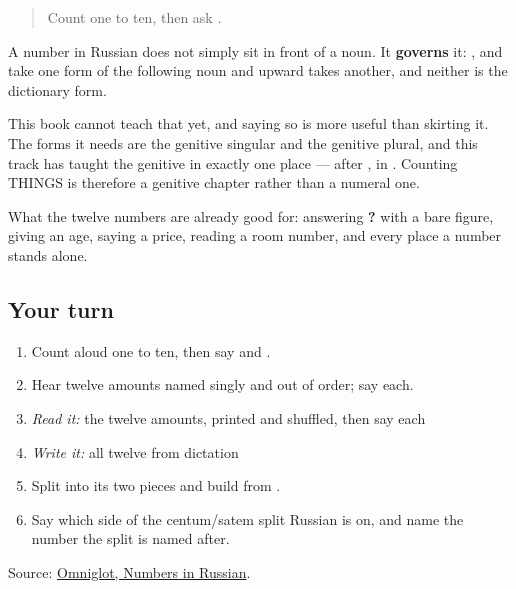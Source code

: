 \label{lesson:RU-C25-practice}



\begin{quote}
Count one to ten, then ask \textbf{}.
\end{quote}

\begin{grammarlens}[title={Grammar Lens: what a Russian number does to the noun after it}]
A number in Russian does not simply sit in front of a noun. It \textbf{governs} it: \textbf{}, \textbf{} and \textbf{} take one form of the following noun and \textbf{} upward takes another, and neither is the dictionary form.

This book cannot teach that yet, and saying so is more useful than skirting it. The forms it needs are the genitive singular and the genitive plural, and this track has taught the genitive in exactly one place — after \textbf{}, in \textbf{ }. Counting THINGS is therefore a genitive chapter rather than a numeral one.

What the twelve numbers are already good for: answering \textbf{?} with a bare figure, giving an age, saying a price, reading a room number, and every place a number stands alone.
\end{grammarlens}

\subsection*{Your turn}
\begin{enumerate}
\raggedright
  \item Count aloud one to ten, then say \textbf{} and \textbf{}.
  \item Hear twelve amounts named singly and out of order; say each.
  \item \emph{Read it:} the twelve amounts, printed and shuffled, then say each
  \item \emph{Write it:} all twelve from dictation
  \item Split \textbf{} into its two pieces and build \textbf{} from \textbf{}.
  \item Say which side of the centum/satem split Russian is on, and name the number the split is named after.
\end{enumerate}

\begin{tcolorbox}[breakable,colback=teal!4,colframe=teal!35!black,title={Before you move on}]
Source: \href{https://www.omniglot.com/language/numbers/russian.htm}{Omniglot, Numbers in Russian}.
\end{tcolorbox}
